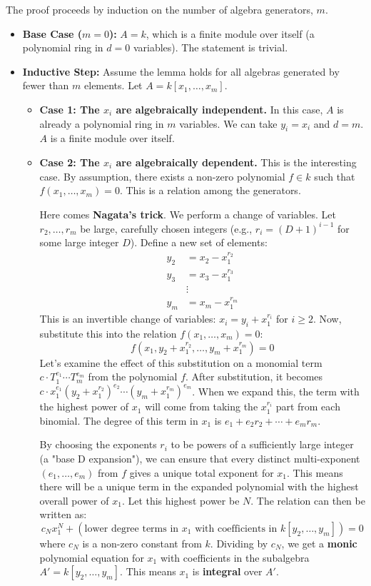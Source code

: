 \documentclass[11pt]{article}
\begin{document}
The proof proceeds by induction on the number of algebra generators, $m$.
\begin{itemize}
    \item \textbf{Base Case ($m=0$):} $A=k$, which is a finite module over itself (a polynomial ring in $d=0$ variables). The statement is trivial.
    \item \textbf{Inductive Step:} Assume the lemma holds for all algebras generated by fewer than $m$ elements. Let $A = k[x_1, \ldots, x_m]$.
    \begin{itemize}
        \item \textbf{Case 1: The $x_i$ are algebraically independent.} In this case, $A$ is already a polynomial ring in $m$ variables. We can take $y_i = x_i$ and $d=m$. $A$ is a finite module over itself.
        \item \textbf{Case 2: The $x_i$ are algebraically dependent.} This is the interesting case. By assumption, there exists a non-zero polynomial $f \in k$ such that $f(x_1, \ldots, x_m) = 0$. This is a relation among the generators.

        Here comes \textbf{Nagata's trick}. We perform a change of variables. Let $r_2, \ldots, r_m$ be large, carefully chosen integers (e.g., $r_i = (D+1)^{i-1}$ for some large integer $D$). Define a new set of elements:
        \begin{align*}
            y_2 &= x_2 - x_1^{r_2} \\
            y_3 &= x_3 - x_1^{r_3} \\
            &\vdots \\
            y_m &= x_m - x_1^{r_m}
        \end{align*}
        This is an invertible change of variables: $x_i = y_i + x_1^{r_i}$ for $i \ge 2$. Now, substitute this into the relation $f(x_1, \ldots, x_m) = 0$:
        \[f(x_1, y_2 + x_1^{r_2}, \ldots, y_m + x_1^{r_m}) = 0\]
        Let's examine the effect of this substitution on a monomial term $c \cdot T_1^{e_1} \cdots T_m^{e_m}$ from the polynomial $f$. After substitution, it becomes $c \cdot x_1^{e_1} (y_2+x_1^{r_2})^{e_2} \cdots (y_m+x_1^{r_m})^{e_m}$. When we expand this, the term with the highest power of $x_1$ will come from taking the $x_1^{r_i}$ part from each binomial. The degree of this term in $x_1$ is $e_1 + e_2 r_2 + \cdots + e_m r_m$.

        By choosing the exponents $r_i$ to be powers of a sufficiently large integer (a "base D expansion"), we can ensure that every distinct multi-exponent $(e_1, \ldots, e_m)$ from $f$ gives a unique total exponent for $x_1$. This means there will be a unique term in the expanded polynomial with the highest overall power of $x_1$. Let this highest power be $N$. The relation can then be written as:
        \[ c_N x_1^N + (\text{lower degree terms in } x_1 \text{ with coefficients in } k[y_2, \ldots, y_m]) = 0 \]
        where $c_N$ is a non-zero constant from $k$. Dividing by $c_N$, we get a \textbf{monic} polynomial equation for $x_1$ with coefficients in the subalgebra $A' = k[y_2, \ldots, y_m]$. This means $x_1$ is \textbf{integral} over $A'$.


\end{itemize}
\end{itemize}
\end{document}

